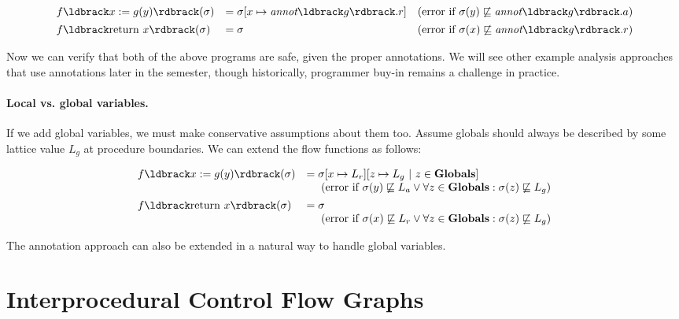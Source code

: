 \documentclass[11pt]{article}
\begin{document}
\[
\begin{array}{lll}

f\parg{x := g(y)}(\sigma) & = \sigma[x \mapsto \textit{annot}\parg{g}.r] & (\mbox{error if}~ \sigma(y) \not\alap \textit{annot}\parg{g}.a) \\[1ex]
f\parg{\mbox{return}~ x}(\sigma) & = \sigma & (\mbox{error if}~ \sigma(x) \not\alap \textit{annot}\parg{g}.r) \\

\end{array}
\]

\noindent Now we can verify that both of the above programs are safe, given the proper annotations.
We will see other example analysis approaches that use annotations later in the semester, though historically, programmer buy-in remains a challenge in practice.

\paragraph{Local vs. global variables.}

If we add global variables, we must make conservative assumptions about them too.  Assume globals should always be described by some lattice value $L_g$ at procedure boundaries.  We can extend the flow functions as follows:

\[
\begin{array}{lll}

f\parg{x := g(y)}(\sigma) & = \sigma[x \mapsto L_r][z \mapsto L_g ~|~ z \in \mathbf{Globals}]\\
& ~~~~(\mbox{error if}~ \sigma(y) \not\alap L_a \lor \forall z \in \mathbf{Globals}: \sigma(z) \not\alap L_g)\\[1ex]
f\parg{\mbox{return}~ x}(\sigma) & = \sigma\\
& ~~~~(\mbox{error if}~ \sigma(x) \not\alap L_r \lor \forall z \in \mathbf{Globals}: \sigma(z) \not\alap L_g)\\

\end{array}
\]

The annotation approach can also be extended in a natural way to handle global variables.

\section{Interprocedural Control Flow Graphs}

\end{document}
